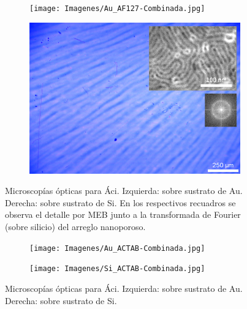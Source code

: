     	
    	
     	     \begin{figure}
	 	   	    \begin{subfigure}{0.495\textwidth}
		       	\texttt{[image: Imagenes/Au\_AF127-Combinada.jpg]}
		   		\end{subfigure}
		   		\begin{subfigure}{0.495\textwidth}
		   	    \includegraphics[width=\textwidth]{Imagenes/Si_AF127-Combinada.jpg}
		   		\end{subfigure}
				 \caption[Microscopía óptica \pdmF tratamiento en medio ácido.]{Microscopías ópticas para Áci\pdmF. Izquierda: sobre sustrato de Au. Derecha: sobre sustrato de Si. En los respectivos recuadros se observa el detalle por MEB junto a la transformada de Fourier (sobre silicio) del arreglo nanoporoso.}
				 \label{fig:Microscopia_F127_acido}	
			     \end{figure}
   		
   			\begin{figure}
 	   	    \begin{subfigure}{0.495\textwidth}
	       	\texttt{[image: Imagenes/Au\_ACTAB-Combinada.jpg]}
	   		\end{subfigure}
	   		\begin{subfigure}{0.495\textwidth}
	   	    \texttt{[image: Imagenes/Si\_ACTAB-Combinada.jpg]}
	   		\end{subfigure}
			 \caption[Microscopía óptica \pdmC tratamiento en medio ácido.]{Microscopías ópticas para Áci\pdmC. Izquierda: sobre sustrato de Au. Derecha: sobre sustrato de Si.}
			 \label{fig:Microscopia_CTAB_acido}	
		     \end{figure}
   	
